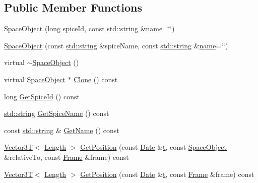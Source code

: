 \subsection*{Public Member Functions}
\begin{DoxyCompactItemize}
\item 
\hyperlink{class_space_object_a2b8e7d63a95ad11bdffebb2a99d1a2d9}{Space\+Object} (long \hyperlink{class_space_object_a841dd12234c1861d3c1978035c9d7b8d}{spice\+Id}, const \hyperlink{glext_8h_ae84541b4f3d8e1ea24ec0f466a8c568b}{std\+::string} \&\hyperlink{glext_8h_ad977737dfc9a274a62741b9500c49a32}{name}=\char`\"{}\char`\"{})
\item 
\hyperlink{class_space_object_a43cc5d5f9207bdf5341e28112aed8285}{Space\+Object} (const \hyperlink{glext_8h_ae84541b4f3d8e1ea24ec0f466a8c568b}{std\+::string} \&spice\+Name, const \hyperlink{glext_8h_ae84541b4f3d8e1ea24ec0f466a8c568b}{std\+::string} \&\hyperlink{glext_8h_ad977737dfc9a274a62741b9500c49a32}{name}=\char`\"{}\char`\"{})
\item 
virtual \hyperlink{class_space_object_a60676c3b81a05900eab791eefde444cc}{$\sim$\+Space\+Object} ()
\item 
virtual \hyperlink{class_space_object}{Space\+Object} $\ast$ \hyperlink{class_space_object_a479f0732cad7fe1f6a1752a1f12eaa7b}{Clone} () const 
\item 
long \hyperlink{class_space_object_a25a8be2d3fd0d272d9060981cff3121f}{Get\+Spice\+Id} () const 
\item 
\hyperlink{glext_8h_ae84541b4f3d8e1ea24ec0f466a8c568b}{std\+::string} \hyperlink{class_space_object_aafe0595c55762e7fe30cb9722b45abe5}{Get\+Spice\+Name} () const 
\item 
const \hyperlink{glext_8h_ae84541b4f3d8e1ea24ec0f466a8c568b}{std\+::string} \& \hyperlink{class_space_object_a5f202bec13294119b30e90f54ba2ed7f}{Get\+Name} () const 
\item 
\hyperlink{class_vector3_t}{Vector3\+T}$<$ \hyperlink{_quantity_8h_ae34580a93ad25d119ae1a64ded5aa3b2}{Length} $>$ \hyperlink{class_space_object_aa88309b3c2a07ba8884a0f665d1a3c15}{Get\+Position} (const \hyperlink{class_date}{Date} \&\hyperlink{glext_8h_a7d65d00ca3b0630d9b5c52df855b19f5}{t}, const \hyperlink{class_space_object}{Space\+Object} \&relative\+To, const \hyperlink{class_frame}{Frame} \&frame) const 
\item 
\hyperlink{class_vector3_t}{Vector3\+T}$<$ \hyperlink{_quantity_8h_ae34580a93ad25d119ae1a64ded5aa3b2}{Length} $>$ \hyperlink{class_space_object_af88472a26b40f422afbe24c17c876cf6}{Get\+Position} (const \hyperlink{class_date}{Date} \&\hyperlink{glext_8h_a7d65d00ca3b0630d9b5c52df855b19f5}{t}, const \hyperlink{class_frame}{Frame} \&frame) const 

\end{DoxyCompactItemize}
